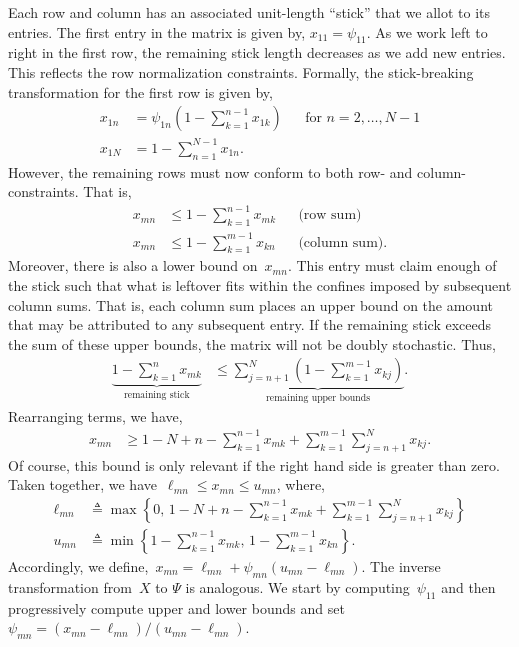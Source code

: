 \documentclass[twoside]{article}
\begin{document}
Each row and column has an associated unit-length ``stick'' that we
allot to its entries.  The first entry in the matrix is given by,
$x_{11} = \psi_{11}$.  As we work left to right in the first row, the
remaining stick length decreases as we add new entries. This reflects
the row normalization constraints.  Formally, the stick-breaking
transformation for the first row is given by,
\begin{align*}
  x_{1n} &= \psi_{1n} \left(1 - \sum_{k=1}^{n-1} x_{1k} \right)  & &  \text{for } n=2, \ldots, N-1\\
  x_{1N} &= 1 - \sum_{n=1}^{N-1} x_{1n}.
\end{align*}
However, the remaining rows must now conform to both row- and
column-constraints. That is,
\begin{align*}
x_{mn} &\leq 1- \sum_{k=1}^{n-1} x_{mk} & & \text{(row sum)} \\
x_{mn} &\leq 1- \sum_{k=1}^{m-1} x_{kn} & & \text{(column sum)}.
\end{align*}
Moreover, there is also a lower bound on~$x_{mn}$. This entry must
claim enough of the stick such that what is leftover fits within
the confines imposed by subsequent column sums. That is, each column
sum places an upper bound on the amount that may be attributed to any
subsequent entry. If the remaining stick exceeds the sum of these
upper bounds, the matrix will not be doubly stochastic.  Thus,
\begin{align*}
\underbrace{1 - \sum_{k=1}^n x_{mk}}_{\text{remaining stick}}
  &\leq \underbrace{\sum_{j=n+1}^N (1- \sum_{k=1}^{m-1} x_{kj})}_{
    \text{remaining upper bounds}}.
\end{align*}
Rearranging terms, we have,
\begin{align*}
  x_{mn} &\geq
1 - N + n - \sum_{k=1}^{n-1} x_{mk}  +  \sum_{k=1}^{m-1} \sum_{j=n+1}^N x_{kj}.
\end{align*}
Of course, this bound is only relevant if the right hand side is greater than zero.
Taken together, we have~$\ell_{mn} \leq x_{mn} \leq u_{mn}$, where,
\begin{align*}
\ell_{mn} &\triangleq \max \left \{0, \, 1 - N + n - \sum_{k=1}^{n-1} x_{mk}  +  \sum_{k=1}^{m-1} \sum_{j=n+1}^N x_{kj} \right \}
\\
u_{mn} &\triangleq 
\min \left \{1- \sum_{k=1}^{n-1} x_{mk}, \,
1- \sum_{k=1}^{m-1} x_{kn} \right\}.
\end{align*}
Accordingly, we define,~${x_{mn} = \ell_{mn} + \psi_{mn} (u_{mn} - \ell_{mn})}$.
The inverse transformation from~$X$ to $\Psi$ is analogous.
We start by computing~$\psi_{11}$ and then progressively compute
upper and lower bounds and set~${\psi_{mn} = (x_{mn} - \ell_{mn})/(u_{mn} - \ell_{mn})}$.
\end{document}
